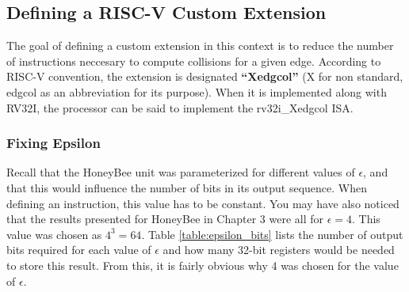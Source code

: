 

\subsection{Defining a RISC-V Custom Extension}

    The goal of defining a custom extension in this context is to reduce the number of instructions neccesary to compute collisions for a given edge. According to RISC-V convention, the extension is designated \textbf{``Xedgcol''} (X for non standard, edgcol as an abbreviation for its purpose). When it is implemented along with RV32I, the processor can be said to implement the rv32i\_Xedgcol ISA.

    \subsubsection{Fixing Epsilon}
    Recall that the HoneyBee unit was parameterized for different values of $\epsilon$, and that this would influence the number of bits in its output sequence. When defining an instruction, this value has to be constant. You may have also noticed that the results presented for HoneyBee in Chapter 3 were all for $\epsilon = 4$. This value was chosen as $4^3 = 64$. Table \ref{table:epsilon_bits} lists the number of output bits required for each value of $\epsilon$ and how many 32-bit registers would be needed to store this result. From this, it is fairly obvious why 4 was chosen for the value of $\epsilon$.

